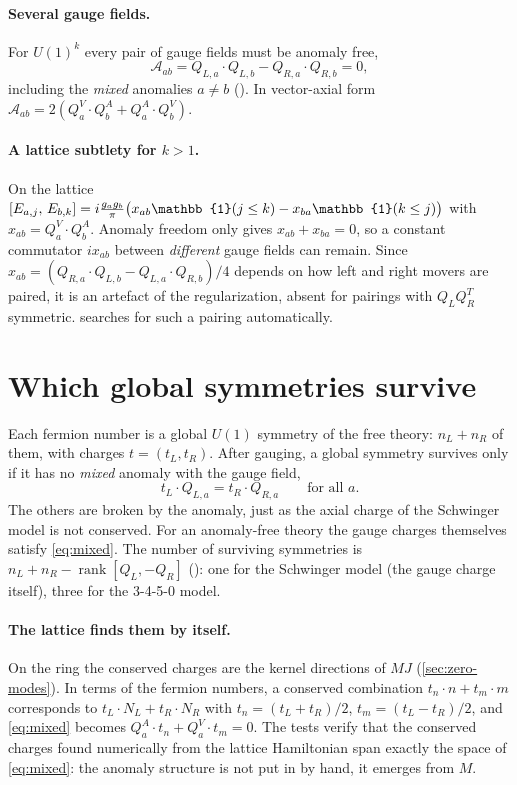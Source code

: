 \paragraph{Several gauge fields.} For $U(1)^k$ every pair of gauge fields must be anomaly free,
\begin{equation}
  \mathcal{A}_{ab} = Q_{L,a}\cdot Q_{L,b} - Q_{R,a}\cdot Q_{R,b} = 0,
\end{equation}
including the \emph{mixed} anomalies $a\neq b$ (). In vector-axial form
$\mathcal{A}_{ab} = 2(Q^V_a\cdot Q^A_b + Q^A_a\cdot Q^V_b)$.

\paragraph{A lattice subtlety for $k>1$.} On the lattice
$\comm{E_{a,j}}{E_{b,k}} = i\frac{g_ag_b}{\pi}\bigl(x_{ab}\mathbb{1}(j\leq k) - x_{ba}\mathbb{1}(k\leq j)\bigr)$
with $x_{ab} = Q^V_a\cdot Q^A_b$. Anomaly freedom only gives $x_{ab} + x_{ba} = 0$, so a constant commutator
$i x_{ab}$ between \emph{different} gauge fields can remain. Since
$x_{ab} = (Q_{R,a}\cdot Q_{L,b} - Q_{L,a}\cdot Q_{R,b})/4$ depends on how left and right movers are paired, it is
an artefact of the regularization, absent for pairings with $Q_LQ_R^T$ symmetric.
 searches for such a pairing automatically.

\section{Which global symmetries survive}
Each fermion number is a global $U(1)$ symmetry of the free theory: $n_L + n_R$ of them, with charges
$t = (t_L, t_R)$. After gauging, a global symmetry survives only if it has no \emph{mixed} anomaly with the
gauge field,
\begin{equation}\label{eq:mixed}
  t_L\cdot Q_{L,a} = t_R\cdot Q_{R,a}\qquad\text{for all } a .
\end{equation}
The others are broken by the anomaly, just as the axial charge of the Schwinger model is not conserved. For an
anomaly-free theory the gauge charges themselves satisfy \eqref{eq:mixed}. The number of surviving symmetries is
$n_L + n_R - \operatorname{rank}[Q_L, -Q_R]$ (): one for the Schwinger model
(the gauge charge itself), three for the 3-4-5-0 model.

\paragraph{The lattice finds them by itself.} On the ring the conserved charges are the kernel directions of
$MJ$ (\cref{sec:zero-modes}). In terms of the fermion numbers, a conserved combination $t_n\cdot n + t_m\cdot m$
corresponds to $t_L\cdot N_L + t_R\cdot N_R$ with $t_n = (t_L+t_R)/2$, $t_m = (t_L-t_R)/2$, and \eqref{eq:mixed}
becomes $Q^A_a\cdot t_n + Q^V_a\cdot t_m = 0$. The tests verify that the conserved charges found numerically from
the lattice Hamiltonian span exactly the space of \eqref{eq:mixed}: the anomaly structure is not put in by hand, it
emerges from $M$.
